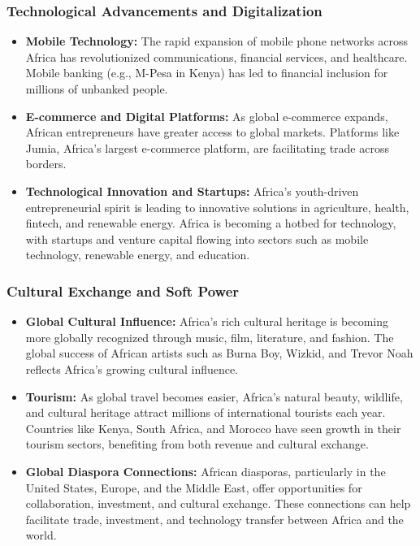 \documentclass[10pt]{article}
\begin{document}
\subsubsection*{Technological Advancements and Digitalization}
\begin{itemize}
  \item \textbf{Mobile Technology:} The rapid expansion of mobile phone networks across Africa
    has revolutionized communications, financial services, and healthcare. Mobile
    banking (e.g., M-Pesa in Kenya) has led to financial inclusion for millions of
    unbanked people.

  \item \textbf{E-commerce and Digital Platforms:} As global e-commerce expands, African
    entrepreneurs have greater access to global markets. Platforms like Jumia,
    Africa's largest e-commerce platform, are facilitating trade across borders.

  \item \textbf{Technological Innovation and Startups:} Africa's youth-driven entrepreneurial
    spirit is leading to innovative solutions in agriculture, health, fintech, and
    renewable energy. Africa is becoming a hotbed for technology, with startups and
    venture capital flowing into sectors such as mobile technology, renewable energy,
    and education.
\end{itemize}

\subsubsection*{Cultural Exchange and Soft Power}
\begin{itemize}
  \item \textbf{Global Cultural Influence:} Africa's rich cultural heritage is becoming more
    globally recognized through music, film, literature, and fashion. The global
    success of African artists such as Burna Boy, Wizkid, and Trevor Noah reflects
    Africa's growing cultural influence.

  \item \textbf{Tourism:} As global travel becomes easier, Africa's natural beauty, wildlife, and
    cultural heritage attract millions of international tourists each year. Countries like
    Kenya, South Africa, and Morocco have seen growth in their tourism sectors,
    benefiting from both revenue and cultural exchange.

  \item \textbf{Global Diaspora Connections:} African diasporas, particularly in the United States,
    Europe, and the Middle East, offer opportunities for collaboration, investment,
    and cultural exchange. These connections can help facilitate trade, investment,
    and technology transfer between Africa and the world.
\end{itemize}
\end{document}
